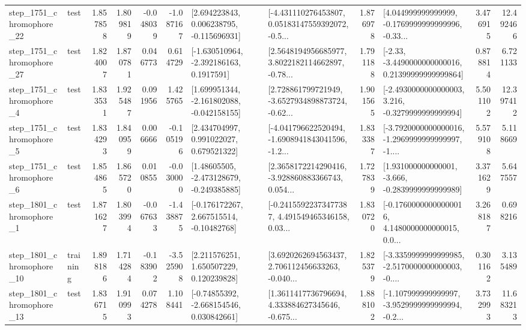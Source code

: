 \begin{tabular}{llrrrrllrlrr}
 step\_1751\_chromophore\_22 &      test &      1.857858 &    1.809819 &     -0.048039 & -1.087167 &    [2.694223843, 0.006238795, -0.115696931] &  [-4.431110276453807, 0.05183147559392072, -0.5... &       1.876978 &  [4.044999999999999, -0.1769999999999996, -0.33... &            3.476915 &         12.492466 \\
 step\_1751\_chromophore\_27 &      test &      1.824007 &    1.870781 &      0.046773 &  0.614729 &     [-1.630510964, -2.392186163, 0.1917591] &  [2.5648194956685977, 3.8022182114662897, -0.78... &       1.791188 &  [-2.33, -3.4490000000000016, 0.21399999999999864] &            0.878814 &          6.721133 \\
  step\_1751\_chromophore\_4 &      test &      1.833531 &    1.925487 &      0.091956 &  1.425765 &   [1.699951344, -2.161802088, -0.042158155] &  [2.728861799721949, -3.6527934898873724, -0.62... &       1.901565 &  [-2.4930000000000003, 3.216, -0.3279999999999994] &            5.501102 &         12.397412 \\
  step\_1751\_chromophore\_5 &      test &      1.834293 &    1.840959 &      0.006666 & -0.105196 &     [2.434704997, 0.991022027, 0.679521322] &  [-4.041796622520494, -1.6908941843041596, -1.2... &       1.833387 &  [-3.7920000000000016, -1.2969999999999997, -1.... &            5.579108 &          5.118669 \\
  step\_1751\_chromophore\_6 &      test &      1.854865 &    1.865720 &      0.010855 & -0.030000 &    [1.48605505, -2.473128679, -0.249385885] &  [2.3658172214290416, -3.928860883366743, 0.054... &       1.727839 &   [1.931000000000001, -3.666, -0.2839999999999989] &            3.371629 &          5.647557 \\
  step\_1801\_chromophore\_1 &      test &      1.871627 &    1.803994 &     -0.067633 & -1.438875 &    [-0.176172267, 2.667515514, -0.10482768] &  [-0.24155922373477387, 4.491549465346158, 0.03... &       1.830720 &  [-0.17600000000000016, 4.1480000000000015, 0.0... &            3.268187 &          0.698216 \\
 step\_1801\_chromophore\_10 &  training &      1.898186 &    1.714284 &     -0.183902 & -3.525908 &     [2.211576251, 1.650507229, 0.120239828] &  [3.6920262694563437, 2.706112456633263, -0.040... &       1.825379 &  [-3.3359999999999985, -2.5170000000000003, -0.... &            0.301162 &          3.135489 \\
 step\_1801\_chromophore\_13 &      test &      1.836715 &    1.910993 &      0.074278 &  1.108441 &    [-0.74855392, -2.668154546, 0.030842661] &  [1.3611417736796694, 4.333884627345646, -0.675... &       1.888102 &  [-1.107999999999997, -3.9529999999999994, -0.2... &            3.732993 &         11.683213 \\

\end{tabular}
